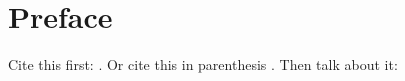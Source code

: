 \documentclass[main.tex]{subfiles}
\begin{document}
	
\chapter*{Preface}
\label{C_preface}

Cite this first: \citet{smith_wealth_2003}. Or cite this in parenthesis \citep{smith_wealth_2003}. Then talk about it:

\lipsum[1]
\end{document}
